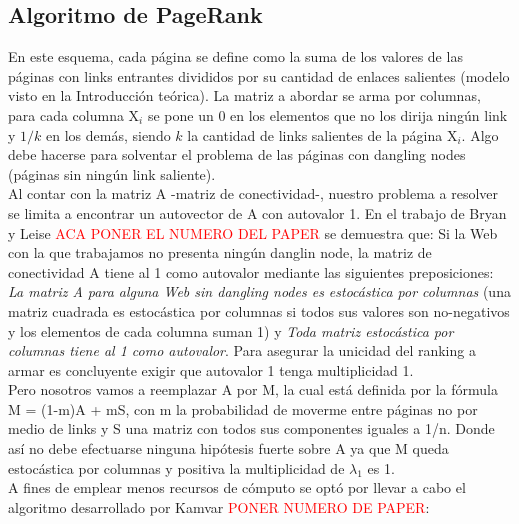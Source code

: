 \documentclass[a4paper]{article}
\begin{document}
\newpage
\subsection{Algoritmo de PageRank}


\indent En este esquema, cada p\'agina se define como la suma de los valores de las p\'aginas con links entrantes divididos por su cantidad de enlaces salientes (modelo visto en la Introducci\'on te\'orica). La matriz a abordar se arma por columnas, para cada columna X$_i$ se pone un 0 en los elementos que no los dirija ning\'un link y $1/k$ en los dem\'as, siendo $k$ la cantidad de links salientes de la p\'agina X$_i$. Algo debe hacerse para solventar el problema de las p\'aginas con dangling nodes (p\'aginas sin ning\'un link saliente).\\
\indent Al contar con la matriz A -matriz de conectividad-, nuestro problema a resolver se limita a encontrar un autovector de A con autovalor 1. En el trabajo de Bryan y Leise \textcolor{red}{ACA PONER EL NUMERO DEL PAPER} se demuestra que: Si la Web con la que trabajamos no presenta ning\'un danglin node, la matriz de conectividad A tiene al 1 como autovalor mediante las siguientes preposiciones: \emph{La matriz A para alguna Web sin dangling nodes es estoc\'astica por columnas} (una matriz cuadrada es estoc\'astica por columnas si todos sus valores son no-negativos y los elementos de cada columna suman 1) y \emph{Toda matriz estoc\'astica por columnas tiene al 1 como autovalor}. Para asegurar la unicidad del ranking a armar es concluyente exigir que autovalor 1 tenga multiplicidad 1. \\
\indent Pero nosotros vamos a reemplazar A por M, la cual est\'a definida por la f\'ormula M = (1-m)A +  mS, con m la probabilidad de moverme entre p\'aginas no por medio de links y S una matriz con todos sus componentes iguales a 1/n. Donde as\'i no debe efectuarse ninguna hip\'otesis fuerte sobre A ya que M queda estoc\'astica por columnas y positiva la multiplicidad de $\lambda_1$ es 1. \\
\indent A fines de emplear menos recursos de c\'omputo se opt\'o por llevar a cabo el algoritmo desarrollado por Kamvar \textcolor{red}{PONER NUMERO DE PAPER}:
\end{document}

